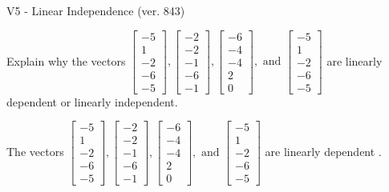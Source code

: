 \begin{exercise}
  \begin{exerciseTitle}V5 - Linear Independence (ver. 843)\end{exerciseTitle}
  \begin{exerciseStatement}
    Explain why the vectors \(\left[\begin{array}{r}
-5 \\
1 \\
-2 \\
-6 \\
-5
\end{array}\right] , \left[\begin{array}{r}
-2 \\
-2 \\
-1 \\
-6 \\
-1
\end{array}\right] , \left[\begin{array}{r}
-6 \\
-4 \\
-4 \\
2 \\
0
\end{array}\right] , \text{ and } \left[\begin{array}{r}
-5 \\
1 \\
-2 \\
-6 \\
-5
\end{array}\right]\) are linearly dependent or linearly independent.	


  \end{exerciseStatement}
  \begin{exerciseAnswer}
   The vectors \(\left[\begin{array}{r}
-5 \\
1 \\
-2 \\
-6 \\
-5
\end{array}\right] , \left[\begin{array}{r}
-2 \\
-2 \\
-1 \\
-6 \\
-1
\end{array}\right] , \left[\begin{array}{r}
-6 \\
-4 \\
-4 \\
2 \\
0
\end{array}\right] , \text{ and } \left[\begin{array}{r}
-5 \\
1 \\
-2 \\
-6 \\
-5
\end{array}\right]\) are 
  	 linearly dependent  .
  


  \end{exerciseAnswer}
\end{exercise}